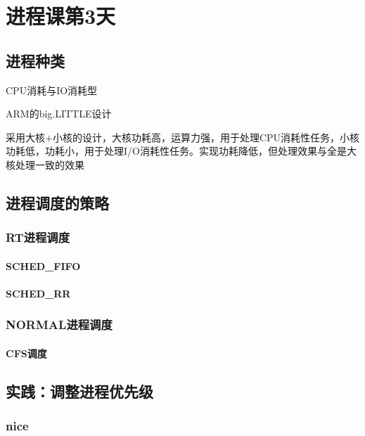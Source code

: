 


\part{进程课第3天}
\chapter{进程种类}
 CPU消耗与IO消耗型
\begin{example*}
  \wdexpbox
  {\caption{ARM的big.LITTLE设计}}
  {采用大核+小核的设计，大核功耗高，运算力强，用于处理CPU消耗性任务，小核功耗低，功耗小，用于处理I/O消耗性任务。实现功耗降低，但处理效果与全是大核处理一致的效果}
\end{example*}

\chapter{进程调度的策略}
\section{RT进程调度}
\subsection{SCHED\_FIFO}
\subsection{SCHED\_RR}


\section{NORMAL进程调度}
\subsection{CFS调度}
\clearpage


\chapter{实践：调整进程优先级}
\section{nice}
\clearpage
